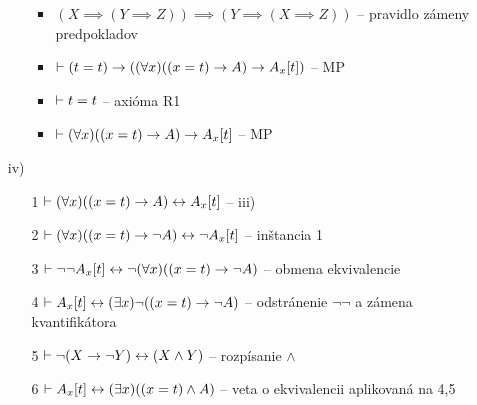 \begin{dokaz}
\begin{itemize}
\begin{itemize}
\begin{itemize}
                \item $(X \implies (Y \implies Z)) \implies
                       (Y \implies (X \implies Z))$ -- pravidlo zámeny
                       predpokladov

                \item $\vdash (t=t) \rightarrow ((\forall x) ((x=t)
                    \rightarrow A) \rightarrow A_x[t])$ -- MP

                \item $\vdash t=t$ -- axióma R1

                \item $\vdash (\forall x) ((x=t)
                    \rightarrow A) \rightarrow A_x[t]$ -- MP
                \end{itemize}
            \end{itemize}
        \item[iv)]
            \begin{itemize}
            \item[1] $\vdash (\forall x)((x=t) \rightarrow A)
                \leftrightarrow A_x[t]$ -- iii)
            \item[2] $\vdash (\forall x)((x=t) \rightarrow \neg A)
                \leftrightarrow \neg A_x[t]$ -- inštancia 1
            \item[3] $\vdash \neg \neg A_x[t] \leftrightarrow
                \neg (\forall x) ((x=t) \rightarrow \neg A)$ -- obmena
                ekvivalencie
            \item[4] $\vdash A_x[t] \leftrightarrow (\exists x) \neg
                ((x=t) \rightarrow \neg A)$ -- odstránenie $\neg \neg$ a
                zámena kvantifikátora
            \item[5] $\vdash \neg(X \rightarrow \neg Y)
                \leftrightarrow  (X \land Y)$ -- rozpísanie
                $\land$
            \item[6] $\vdash A_x[t] \leftrightarrow (\exists x)
                ((x=t) \land A)$ -- veta o ekvivalencii aplikovaná na
                4,5

            \end{itemize}
    \end{itemize}
\end{dokaz}

